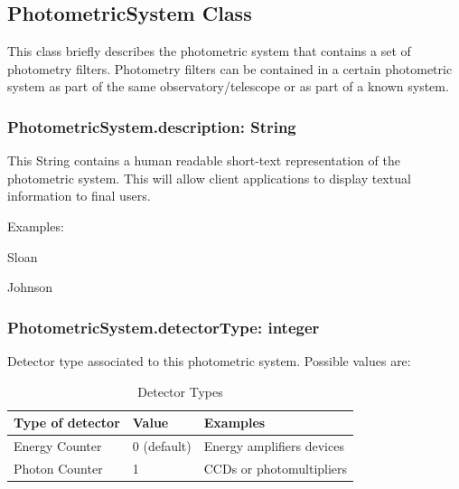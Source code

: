 \documentclass[11pt,a4paper]{ivoa}
\begin{document}
\subsection{PhotometricSystem Class}
This class briefly describes the photometric system that contains a set of 
photometry filters. Photometry filters can be contained in a certain 
photometric system as part of the same observatory/telescope or as part 
of a known system.
\par

\subsubsection{PhotometricSystem.description: String}
This String contains a human readable short-text representation of the 
photometric system. This will allow client applications to display 
textual information to final users.
\par

Examples:


Sloan \par
Johnson
\bigskip



\subsubsection{PhotometricSystem.detectorType: integer}
Detector type associated to this photometric system. Possible 
values are:




\begin{table}[ht]
 			\centering
\begin{tabular}{p{2.42in}p{0.8in}p{1.55in}}
\hline
\multicolumn{1}{|p{2.42in}}{Type of detector} &
\multicolumn{1}{|p{0.8in}}{Value} &
\multicolumn{1}{|p{1.55in}|}{Examples} \\
\hline
\multicolumn{1}{|p{2.42in}}{Energy Counter} &
\multicolumn{1}{|p{0.8in}}{0 (default)} &
\multicolumn{1}{|p{1.55in}|}{Energy amplifiers devices} \\
\hline
\multicolumn{1}{|p{2.42in}}{Photon Counter} &
\multicolumn{1}{|p{0.8in}}{1} &
\multicolumn{1}{|p{1.55in}|}{CCDs or photomultipliers} \\
\hline
\end{tabular}
\caption{Detector Types}
 \end{table}
\end{document}
